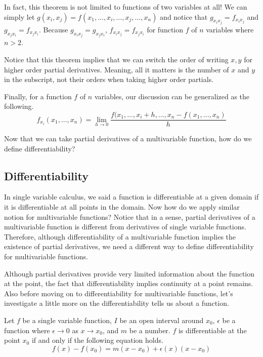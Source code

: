 \documentclass[../../../main.tex]{subfiles}
\begin{document}
In fact, this theorem is not limited to functions of two variables
at all! We can simply let $g(x_i, x_j) = f(x_1, \ldots, x_i, \ldots,
x_j, \ldots, x_n)$ and notice that $g_{x_i x_j} = f_{x_i x_j}$ and
$g_{x_j x_i} = f_{x_j x_i}$. Because $g_{x_i x_j} = g_{x_j x_i}$,
$f_{x_i x_j} = f_{x_j x_i}$ for function $f$ of $n$ variables where
$n > 2$.

Notice that this theorem implies that we can switch the order of
writing $x,y$ for higher order partial derivatives. Meaning,
all it matters is the number of $x$ and $y$ in the subscript,
not their orders when taking higher order partials.

\begin{important}
Finally, for a function $f$ of $n$ variables, our discussion can
be generalized as the following.
\[
f_{x_i} (x_1, \ldots, x_n)
= \lim_{h \to 0} \frac{
    f(x_1, \ldots, x_i + h, \ldots, x_n - f(x_1, \ldots, x_n)
}{h}
\]
\end{important}

Now that we can take partial derivatives of a multivariable function,
how do we define differentiability?

\subsection{Differentiability}

In single variable calculus, we said a function is differentiable
at a given domain if it is differentiable at all points in the domain.
Now how do we apply similar notion for multivariable functions?
Notice that in a sense, partial derivatives of a multivariable
function is different from derivatives of single variable functions.
Therefore, although differentiability of a multivariable function
implies the existence of partial derivatives, we need a different way
to define differentiability for multivariable functions.

Although partial derivatives provide very limited information about
the function at the point, the fact that differentiability implies
continuity at a point remains. Also before moving on to
differentiability for multivariable functions, let's investigate
a little more on the differentiability tells us about a function.

\begin{important}
Let $f$ be a single variable function, $I$ be an open interval around
$x_0$, $\epsilon$ be a function where $\epsilon \to 0$ as $x \to x_0$,
and $m$ be a number. $f$ is differentiable at the point $x_0$
if and only if the following equation holds.
\[
f(x) - f(x_0) = m(x - x_0) + \epsilon(x) (x - x_0)
\]
\end{important}
\end{document}

